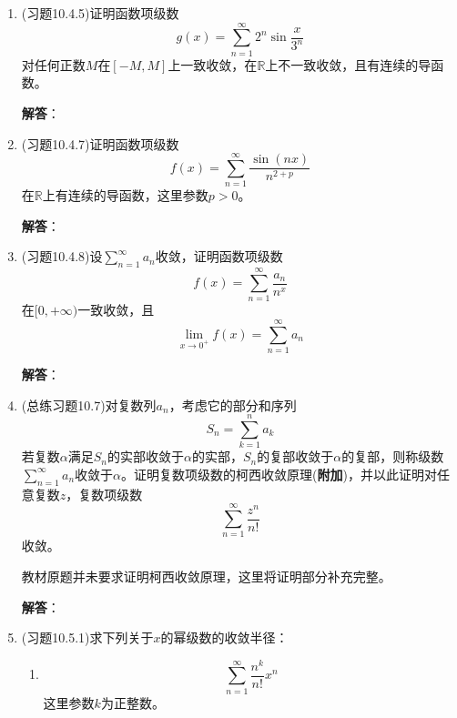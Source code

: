 \documentclass[a4paper,UTF8,fontset=windows,AutoFakeBold]{ctexart}
\newcommand*{\er}{\mathrm{e}}
\newcommand*{\rb}{\mathbb{R}}
\newcommand*{\suminf}[1][n=1]{\sum_{#1}^\infty}
\newcommand*{\extra}{\textbf{附加}}
\newcommand*{\note}{\noindent *}
\theoremstyle{ex}
\newcommand{\sol}[1]{{\vspace{5pt}\kaishu\noindent\textbf{解答}：\vspace{-3pt}
\begin{compactitem}
    \item[] #1
\end{compactitem}
}}
\begin{document}
\begin{enumerate}
\begin{enumerate}
        \sol{

        }

        \item[(4)] $$\suminf\frac{x}{1+4n^4x^2},\quad x\in\rb$$
        
        \sol{

        }

        \item[(7)] $$\suminf(-1)^{n-1}x^2\er^{-nx^2},\quad x\in\rb$$
        
        \sol{
            直接计算可知
            $$$$
        }
    \end{enumerate}

    \item (习题10.4.5)证明函数项级数
    $$g(x)=\suminf 2^n\sin\frac{x}{3^n}$$
    对任何正数$M$在$[-M,M]$上一致收敛，在$\rb$上不一致收敛，且有连续的导函数。

    \sol{

    }

    \item (习题10.4.7)证明函数项级数
    $$f(x)=\suminf\frac{\sin(nx)}{n^{2+p}}$$
    在$\rb$上有连续的导函数，这里参数$p>0$。

    \sol{

    }

    \item (习题10.4.8)设$\suminf a_n$收敛，证明函数项级数
    $$f(x)=\suminf\frac{a_n}{n^x}$$
    在$[0,+\infty)$一致收敛，且
    $$\lim_{x\to0^+}f(x)=\suminf a_n$$

    \sol{

    }

    \item (总练习题10.7)对复数列$a_n$，考虑它的部分和序列
    $$S_n=\sum_{k=1}^na_k$$
    若复数$\alpha$满足$S_n$的实部收敛于$\alpha$的实部，$S_n$的复部收敛于$\alpha$的复部，则称级数$\suminf a_n$收敛于$\alpha$。证明复数项级数的柯西收敛原理(\extra)，并以此证明对任意复数$z$，复数项级数
    $$\suminf\frac{z^n}{n!}$$
    收敛。

    \note 教材原题并未要求证明柯西收敛原理，这里将证明部分补充完整。

    \sol{

    }

    \item (习题10.5.1)求下列关于$x$的幂级数的收敛半径：
    \begin{enumerate}
        \item[(2)] $$\suminf\frac{n^k}{n!}x^n$$
        这里参数$k$为正整数。


\end{enumerate}
\end{enumerate}
\end{document}
